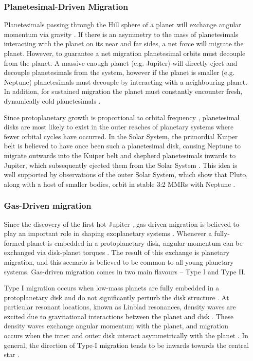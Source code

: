 \subsubsection{Planetesimal-Driven Migration}
Planetesimals passing through the Hill sphere of a planet will exchange angular momentum via gravity \citep{Ida2000, Kirsh2009}.
If there is an asymmetry to the mass of planetesimals interacting with the planet on its near and far sides, a net force will migrate the planet. 
However, to guarantee a net migration planetesimal orbits must decouple from the planet. 
A massive enough planet (e.g. Jupiter) will directly eject and decouple planetesimals from the system, however if the planet is smaller (e.g. Neptune) planetesimals must decouple by interacting with a neighbouring planet. 
In addition, for sustained migration the planet must constantly encounter fresh, dynamically cold planetesimals \citep{Gomes2004}.  

Since protoplanetary growth is proportional to orbital frequency \citep[e.g.][]{Rafikov2003}, planetesimal disks are most likely to exist in the outer reaches of planetary systems where fewer orbital cycles have occurred. 
In the Solar System, the primordial Kuiper belt is believed to have once been such a planetesimal disk, causing Neptune to migrate outwards into the Kuiper belt and shepherd planetesimals inwards to Jupiter, which subsequently ejected them from the Solar System \citep{Fernandez1984}.
This idea is well supported by observations of the outer Solar System, which show that Pluto, along with a host of smaller bodies, orbit in stable 3:2 MMRs with Neptune \citep{Malhotra1993, Malhotra1995}.

\subsubsection{Gas-Driven migration}
Since the discovery of the first hot Jupiter \citep{Mayor1995}, gas-driven migration is believed to play an important role in shaping exoplanetary systems \citep{Lin1996}.
Whenever a fully-formed planet is embedded in a protoplanetary disk, angular momentum can be exchanged via disk-planet torques \citep{Goldreich1980}.
The result of this exchange is planetary migration, and this scenario is believed to be common to all young planetary systems. 
Gas-driven migration comes in two main flavours -- Type I and Type II. 

Type I migration occurs when low-mass planets are fully embedded in a protoplanetary disk and do not significantly perturb the disk structure \citep{Armitage2010}. 
At particular resonant locations, known as Linblad resonances, density waves are excited due to gravitational interactions between the planet and disk \citep{Goldreich1979}. 
These density waves exchange angular momentum with the planet, and migration occurs when the inner and outer disk interact asymmetrically with the planet \citep{Goldreich1979}.
In general, the direction of Type-I migration tends to be inwards towards the central star \citep{Ward1997}.

